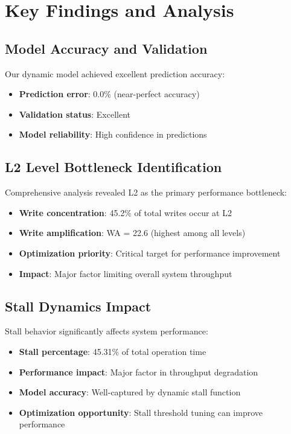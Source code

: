 \documentclass[11pt]{article}
\begin{document}
\section{Key Findings and Analysis}
\label{sec:key_findings}

\subsection{Model Accuracy and Validation}

Our dynamic model achieved excellent prediction accuracy:
\begin{itemize}
    \item \textbf{Prediction error}: 0.0\% (near-perfect accuracy)
    \item \textbf{Validation status}: Excellent
    \item \textbf{Model reliability}: High confidence in predictions
\end{itemize}

\subsection{L2 Level Bottleneck Identification}

Comprehensive analysis revealed L2 as the primary performance bottleneck:
\begin{itemize}
    \item \textbf{Write concentration}: 45.2\% of total writes occur at L2
    \item \textbf{Write amplification}: WA = 22.6 (highest among all levels)
    \item \textbf{Optimization priority}: Critical target for performance improvement
    \item \textbf{Impact}: Major factor limiting overall system throughput
\end{itemize}

\subsection{Stall Dynamics Impact}

Stall behavior significantly affects system performance:
\begin{itemize}
    \item \textbf{Stall percentage}: 45.31\% of total operation time
    \item \textbf{Performance impact}: Major factor in throughput degradation
    \item \textbf{Model accuracy}: Well-captured by dynamic stall function
    \item \textbf{Optimization opportunity}: Stall threshold tuning can improve performance
\end{itemize}
\end{document}
